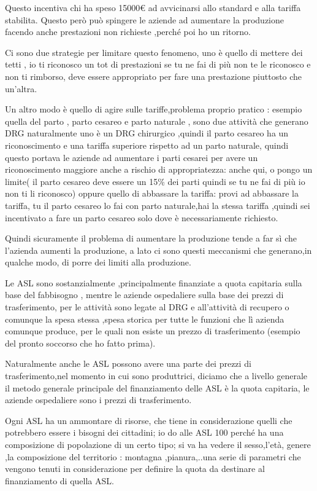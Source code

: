 Questo incentiva chi ha speso 15000\euro{} ad avvicinarsi allo standard
e alla tariffa stabilita. Questo però può spingere le aziende ad
aumentare la produzione facendo anche prestazioni non richieste ,perché
poi ho un ritorno.

Ci sono due strategie per limitare questo fenomeno, uno è quello di
mettere dei tetti , io ti riconosco un tot di prestazioni se tu ne fai
di più non te le riconosco e non ti rimborso, deve essere appropriato
per fare una prestazione piuttosto che un'altra.

Un altro modo è quello di agire sulle tariffe,problema proprio pratico :
esempio quella del parto , parto cesareo e parto naturale , sono due
attività che generano DRG naturalmente uno è un DRG chirurgico ,quindi
il parto cesareo ha un riconoscimento e una tariffa superiore rispetto
ad un parto naturale, quindi questo portava le aziende ad aumentare i
parti cesarei per avere un riconoscimento maggiore anche a rischio di
appropriatezza: anche qui, o pongo un limite( il parto cesareo deve
essere un 15\% dei parti quindi se tu ne fai di più io non ti li
riconosco) oppure quello di abbassare la tariffa: provi ad abbassare la
tariffa, tu il parto cesareo lo fai con parto naturale,hai la stessa
tariffa ,quindi sei incentivato a fare un parto cesareo solo dove è
necessariamente richiesto.

Quindi sicuramente il problema di aumentare la produzione tende a far sì
che l'azienda aumenti la produzione, a lato ci sono questi meccanismi
che generano,in qualche modo, di porre dei limiti alla produzione.

Le ASL sono sostanzialmente ,principalmente finanziate a quota capitaria
sulla base del fabbisogno , mentre le aziende ospedaliere sulla base dei
prezzi di trasferimento, per le attività sono legate al DRG e
all'attività di recupero o comunque la spesa stessa ,spesa storica per
tutte le funzioni che lì azienda comunque produce, per le quali non
esiste un prezzo di trasferimento (esempio del pronto soccorso che ho
fatto prima).

Naturalmente anche le ASL possono avere una parte dei prezzi di
trasferimento,nel momento in cui sono produttrici, diciamo che a livello
generale il metodo generale principale del finanziamento delle ASL è la
quota capitaria, le aziende ospedaliere sono i prezzi di trasferimento.

Ogni ASL ha un ammontare di risorse, che tiene in considerazione quelli
che potrebbero essere i bisogni dei cittadini; io do alle ASL 100 perché
ha una composizione di popolazione di un certo tipo; si va ha vedere il
sesso,l'età, genere ,la composizione del territorio : montagna
,pianura,..una serie di parametri che vengono tenuti in considerazione
per definire la quota da destinare al finanziamento di quella ASL.

